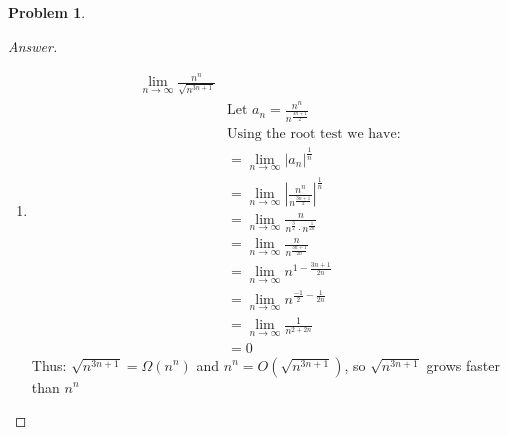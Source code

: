 \documentclass[11pt]{article}
\theoremstyle{definition}
\theoremstyle{definition}
\newtheorem{required}{Problem}
\theoremstyle{definition}
\begin{document}
\begin{required}
\begin{enumerate}[label=(\alph*)]
\begin{proof}[Answer]
\begin{enumerate}
\item
\begin{align*}
\lim_{n \to \infty} \frac{n^n}{\sqrt{n^{3n+1}}} \\
&\text{Let } a_n=  \frac{n^n}{n^{\frac{3n+1}{2}}} \\
&\text{Using the root test we have: } \\
&=\lim_{n \to \infty} {|a_n|}^{\frac{1}{n}}\\
&=\lim_{n \to \infty} {|\frac{n^n}{n^{\frac{3n+1}{2}}}|}^{\frac{1}{n}}\\
&=\lim_{n \to \infty}  \frac{n}{n^{\frac{3}{2}}\cdot n^{\frac{1}{2n}} } \\
&=\lim_{n \to \infty}  \frac{n}{n^{\frac{3n+1}{2n}} } \\
&=\lim_{n \to \infty}  {n^{1-{\frac{3n+1}{2n}}}} \\
&=\lim_{n \to \infty} n^{{\frac{-1}{2}}-{\frac{1}{2n}}}\\
&=\lim_{n \to \infty} \frac{1}{n^{2+2n}}\\
&= 0
\end{align*}
Thus: $\sqrt{n^{3n+1}}= \Omega(n^n)$ and $n^n =O(\sqrt{n^{3n+1}})$, so $\sqrt{n^{3n+1}}$ grows faster than $n^n$


\end{enumerate}


        \end{proof}
\end{enumerate}

\end{required}



\newpage
\end{document}
